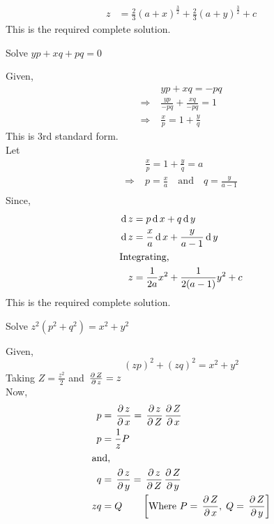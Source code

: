 \documentclass[../main-sheet.tex]{subfiles}
\begin{document}
\begin{enumerate}[label=\underline{Type - \Roman*}:]
\begin{soln}
\begin{align*}
            z&=\frac{2}{3}(a+x)^{\frac{3}{2}}+\frac{2}{3}(a+y)^{\frac{3}{2}}+c
        \end{align*}
        This is the required complete solution.
    \end{soln}
    \begin{prob}
        Solve \(yp+xq+pq=0\)
    \end{prob}
    \begin{soln}
        Given,
        \begin{align*}
            &yp+xq=-pq\\
            \Rightarrow\;&\frac{yp}{-pq}+\frac{xq}{-pq}=1\\
            \Rightarrow\;&\frac{x}{p}=1+\frac{y}{q}
        \end{align*}
        This is 3rd standard form.\\
        Let 
        \begin{align*}
            &\frac{x}{p}=1+\frac{y}{q}=a\\
            \Rightarrow\;&p=\frac{x}{a}\quad \text{and}\quad q=\frac{y}{a-1}\\
        \end{align*}
        Since,
        \begin{align*}
            \,\mathrm{d}\, z&=p \,\mathrm{d}\, x+q\,\mathrm{d}\, y\\
            \,\mathrm{d}\, z&=\frac{x}{a}\,\mathrm{d}\, x+\frac{y}{a-1}\,\mathrm{d}\, y\\
            \intertext{Integrating,}
            z&=\frac{1}{2a}x^2+\frac{1}{2(a-1)}y^2+c
        \end{align*}
        This is the required complete solution.
    \end{soln}
    \begin{prob}
        Solve \(z^2(p^2+q^2)=x^2+y^2\)
    \end{prob}
    \begin{soln}
        Given,
        \begin{equation}
            (zp)^2+(zq)^2=x^2+y^2\label{eq:t3.11.1}
        \end{equation}
        Taking \(Z=\frac{z^2}{2}\) and \(\,\frac{\partial\, Z}{\partial\, z}=z\)\\
        Now,
        \begin{align*}
            p&=\pdx{z}=\pd{z}{Z}\pdx{Z}\\
            p&=\frac{1}{z}P\\
            \intertext{and,}
            q&=\pdy{z}=\pd{z}{Z}\pdy{Z}\\
            zq&=Q\qquad\left[\text{Where } P=\pdx{Z},\;Q=\pdy{Z}\right]

\end{align*}
\end{soln}
\end{enumerate}
\end{document}
